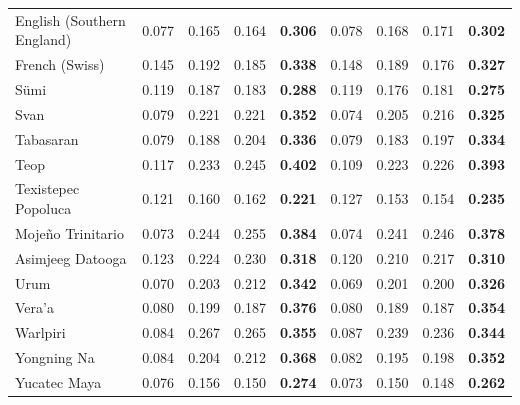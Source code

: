 \begin{longtable}{lcccccccc}
English (Southern England) & 0.077 & 0.165 & 0.164 & \textbf{0.306} & 0.078 & 0.168 & 0.171 & \textbf{0.302} \\
French (Swiss) & 0.145 & 0.192 & 0.185 & \textbf{0.338} & 0.148 & 0.189 & 0.176 & \textbf{0.327} \\
Sümi & 0.119 & 0.187 & 0.183 & \textbf{0.288} & 0.119 & 0.176 & 0.181 & \textbf{0.275} \\
Svan & 0.079 & 0.221 & 0.221 & \textbf{0.352} & 0.074 & 0.205 & 0.216 & \textbf{0.325} \\
Tabasaran & 0.079 & 0.188 & 0.204 & \textbf{0.336} & 0.079 & 0.183 & 0.197 & \textbf{0.334} \\
Teop & 0.117 & 0.233 & 0.245 & \textbf{0.402} & 0.109 & 0.223 & 0.226 & \textbf{0.393} \\
Texistepec Popoluca & 0.121 & 0.160 & 0.162 & \textbf{0.221} & 0.127 & 0.153 & 0.154 & \textbf{0.235} \\
Mojeño Trinitario & 0.073 & 0.244 & 0.255 & \textbf{0.384} & 0.074 & 0.241 & 0.246 & \textbf{0.378} \\
Asimjeeg Datooga & 0.123 & 0.224 & 0.230 & \textbf{0.318} & 0.120 & 0.210 & 0.217 & \textbf{0.310} \\
Urum & 0.070 & 0.203 & 0.212 & \textbf{0.342} & 0.069 & 0.201 & 0.200 & \textbf{0.326} \\
Vera'a & 0.080 & 0.199 & 0.187 & \textbf{0.376} & 0.080 & 0.189 & 0.187 & \textbf{0.354} \\
Warlpiri & 0.084 & 0.267 & 0.265 & \textbf{0.355} & 0.087 & 0.239 & 0.236 & \textbf{0.344} \\
Yongning Na & 0.084 & 0.204 & 0.212 & \textbf{0.368} & 0.082 & 0.195 & 0.198 & \textbf{0.352} \\
Yucatec Maya & 0.076 & 0.156 & 0.150 & \textbf{0.274} & 0.073 & 0.150 & 0.148 & \textbf{0.262} \\
\end{longtable}
\endgroup